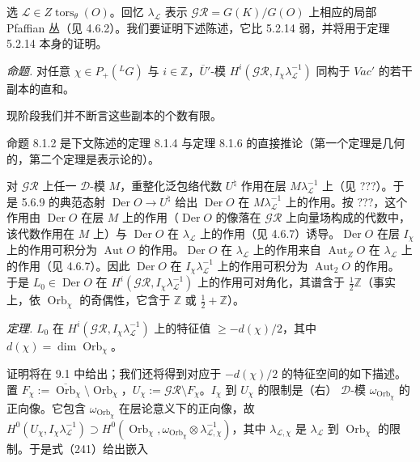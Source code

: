 


 选 $\mathcal{L}\in Z\operatorname{tors}_{\theta}(O)$。回忆 $\lambda_{\mathcal{L}}$ 表示 $\mathcal{GR}=G(K)/G(O)$ 上相应的局部 Pfaffian 丛（见 4.6.2）。我们要证明下述陈述，它比 5.2.14 弱，并将用于定理 5.2.14 本身的证明。

 \emph{命题.} 对任意 $\chi\in P_{+}({}^{L}G)$ 与 $i\in\mathbb{Z}$，$\overline{U}'$-模 $H^{i}(\mathcal{GR},I_{\chi}\lambda_{\mathcal{L}}^{-1})$ 同构于 $\mathit{Vac}'$ 的若干副本的直和。

现阶段我们并不断言这些副本的个数有限。

命题 8.1.2 是下文陈述的定理 8.1.4 与定理 8.1.6 的直接推论（第一个定理是几何的，第二个定理是表示论的）。

 对 $\mathcal{GR}$ 上任一 $\mathcal{D}$-模 $M$，重整化泛包络代数 $U^{\natural}$ 作用在层 $M\lambda_{\mathcal{L}}^{-1}$ 上（见 ???）。于是 5.6.9 的典范态射 $\operatorname{Der}O\to U^{\natural}$ 给出 $\operatorname{Der}O$ 在 $M\lambda_{\mathcal{L}}^{-1}$ 上的作用。按 ???，这个作用由 $\operatorname{Der}O$ 在层 $M$ 上的作用（$\operatorname{Der}O$ 的像落在 $\mathcal{GR}$ 上向量场构成的代数中，该代数作用在 $M$ 上）与 $\operatorname{Der}O$ 在 $\lambda_{\mathcal{L}}$ 上的作用（见 4.6.7）诱导。$\operatorname{Der}O$ 在层 $I_{\chi}$ 上的作用可积分为 $\operatorname{Aut}O$ 的作用。$\operatorname{Der}O$ 在 $\lambda_{\mathcal{L}}$ 上的作用来自 $\operatorname{Aut}_{Z}O$ 在 $\lambda_{\mathcal{L}}$ 上的作用（见 4.6.7）。因此 $\operatorname{Der}O$ 在 $I_{\chi}\lambda_{\mathcal{L}}^{-1}$ 上的作用可积分为 $\operatorname{Aut}_{2}O$ 的作用。
于是 $L_{0}\in\operatorname{Der}O$ 在 $H^{i}(\mathcal{GR},I_{\chi}\lambda_{\mathcal{L}}^{-1})$ 上的作用可对角化，其谱含于 $\frac{1}{2}\mathbb{Z}$（事实上，依 $\operatorname{Orb}_{\chi}$ 的奇偶性，它含于 $\mathbb{Z}$ 或 $\frac{1}{2}+\mathbb{Z}$）。

 \emph{定理.} $L_{0}$ 在 $H^{i}(\mathcal{GR},I_{\chi}\lambda_{\mathcal{L}}^{-1})$ 上的特征值 $\ge -d(\chi)/2$，其中 $d(\chi)=\dim\operatorname{Orb}_{\chi}$。

证明将在 9.1 中给出；我们还将得到对应于 $-d(\chi)/2$ 的特征空间的如下描述。置 $F_{\chi}:=\overline{\operatorname{Orb}}_{\chi}\setminus\operatorname{Orb}_{\chi}$，$U_{\chi}:=\mathcal{GR}\setminus F_{\chi}$。$I_{\chi}$ 到 $U_{\chi}$ 的限制是（右） $\mathcal{D}$-模 $\omega_{\operatorname{Orb}_{\chi}}$ 的正向像。它包含 $\omega_{\operatorname{Orb}_{\chi}}$ 在层论意义下的正向像，故 $H^{0}(U_{\chi},I_{\chi}\lambda_{\mathcal{L}}^{-1})\supset H^{0}(\operatorname{Orb}_{\chi},\omega_{\operatorname{Orb}_{\chi}}\otimes\lambda_{\mathcal{L},\chi}^{-1})$，其中 $\lambda_{\mathcal{L},\chi}$ 是 $\lambda_{\mathcal{L}}$ 到 $\operatorname{Orb}_{\chi}$ 的限制。于是式（241）给出嵌入

